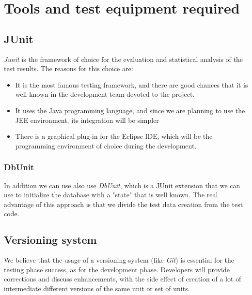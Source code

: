 \chapter{Tools and test equipment required}
\section{JUnit}
\textit{Junit} is the framework of choice for the evaluation and statistical analysis of the test results. The reasons for this choice are:
\begin{itemize}
	\item It is the most famous testing framework, and there are good chances that it is well known in the development team devoted to the project.
	\item It uses the Java programming language, and since we are planning to use the JEE environment, its integration will be simpler
	\item There is a graphical plug-in for the Eclipse IDE, which will be the programming environment of choice during the development.
\end{itemize}

\subsection{DbUnit}
In addition we can use also use \textit{DbUnit}, which is a JUnit extension that we can use to initialize the database with a "state" that is well known. The real advantage of this approach is that we divide the test data creation from the test code.

\section{Versioning system}
We believe that the usage of a versioning system (like \textit{Git}) is essential for the testing phase success, as for the development phase. Developers will provide corrections and discuss enhancements, with the side effect of creation of a lot of intermediate different versions of the same unit or set of units.
